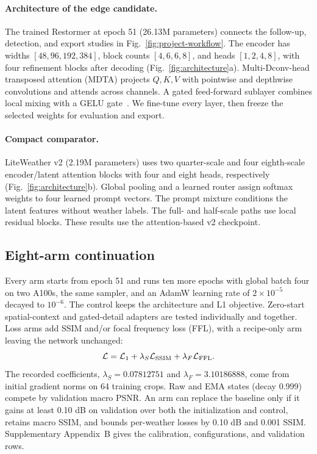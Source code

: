 \paragraph{Architecture of the edge candidate.}
The trained Restormer at epoch 51 (26.13M parameters) connects the follow-up, detection, and export studies in Fig.~\ref{fig:project-workflow}. The encoder has widths $[48,96,192,384]$, block counts $[4,6,6,8]$, and heads $[1,2,4,8]$, with four refinement blocks after decoding (Fig.~\ref{fig:architecture}a). Multi-Dconv-head transposed attention (MDTA) projects $Q,K,V$ with pointwise and depthwise convolutions and attends across channels. A gated feed-forward sublayer combines local mixing with a GELU gate~\cite{Zamir_2022_CVPR}. We fine-tune every layer, then freeze the selected weights for evaluation and export.

\paragraph{Compact comparator.}
LiteWeather v2 (2.19M parameters) uses two quarter-scale and four eighth-scale encoder/latent attention blocks with four and eight heads, respectively (Fig.~\ref{fig:architecture}b). Global pooling and a learned router assign softmax weights to four learned prompt vectors. The prompt mixture conditions the latent features without weather labels. The full- and half-scale paths use local residual blocks. These results use the attention-based v2 checkpoint.

\subsection{Eight-arm continuation}
\label{sec:jointmethod}
Every arm starts from epoch 51 and runs ten more epochs with global batch four on two A100s, the same sampler, and an AdamW learning rate of $2\times10^{-5}$ decayed to $10^{-6}$. The control keeps the architecture and L1 objective. Zero-start spatial-context and gated-detail adapters are tested individually and together. Loss arms add SSIM and/or focal frequency loss (FFL), with a recipe-only arm leaving the network unchanged:
\begin{equation}
\mathcal L=\mathcal L_1+\lambda_S\mathcal L_{\rm SSIM}
+\lambda_F\mathcal L_{\rm FFL}.
\end{equation}
The recorded coefficients, $\lambda_S=0.07812751$ and $\lambda_F=3.10186888$, come from initial gradient norms on 64 training crops. Raw and EMA states (decay 0.999) compete by validation macro PSNR. An arm can replace the baseline only if it gains at least 0.10 dB on validation over both the initialization and control, retains macro SSIM, and bounds per-weather losses by 0.10 dB and 0.001 SSIM. Supplementary Appendix~B gives the calibration, configurations, and validation rows.
